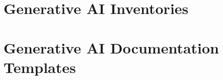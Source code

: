 \documentclass[fleqn]{article}
\begin{document}

\section{Generative AI Inventories}\label{sec:inv}



\section{Generative AI Documentation Templates}\label{sec:doc}

\end{document}
